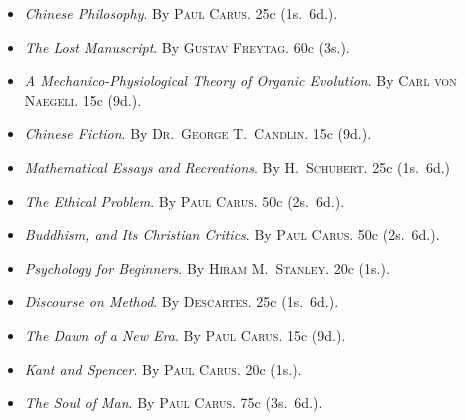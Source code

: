 \documentclass[oneside]{book}
\begin{document}
\begin{small}
\begin{itemize}
\item[]\hspace{-3ex}
\textit{Chinese Philosophy}. By \textsc{Paul Carus}. 25c (1s.~6d.).

\item[]\hspace{-3ex}
\textit{The Lost Manuscript}. By \textsc{Gustav Freytag}. 60c (3s.).

\item[]\hspace{-3ex}
\textit{A Mechanico-Physiological Theory of Organic Evolution}. By \textsc{Carl von
Naegeli}. 15c (9d.).

\item[]\hspace{-3ex}
\textit{Chinese Fiction}. By \textsc{Dr.\ George T.\ Candlin}. 15c (9d.).

\item[]\hspace{-3ex}
\textit{Mathematical Essays and Recreations}. By \textsc{H.~Schubert}. 25c (1s.~6d.)

\item[]\hspace{-3ex}
\textit{The Ethical Problem}. By \textsc{Paul Carus}. 50c (2s.~6d.).

\item[]\hspace{-3ex}
\textit{Buddhism, and Its Christian Critics}. By \textsc{Paul Carus}. 50c (2s.~6d.).

\item[]\hspace{-3ex}
\textit{Psychology for Beginners}. By \textsc{Hiram M.\ Stanley}. 20c (1s.).

\item[]\hspace{-3ex}
\textit{Discourse on Method}. By \textsc{Descartes}. 25c (1s.~6d.).

\item[]\hspace{-3ex}
\textit{The Dawn of a New Era}. By \textsc{Paul Carus}. 15c (9d.).

\item[]\hspace{-3ex}
\textit{Kant and Spencer}. By \textsc{Paul Carus}. 20c (1s.).

\item[]\hspace{-3ex}
\textit{The Soul of Man}. By \textsc{Paul Carus}. 75c (3s.~6d.).


\end{itemize}
\end{small}
\end{document}
